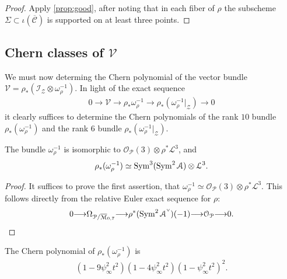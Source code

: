 \documentclass[12pt,reqno]{amsart}
\DeclareMathOperator{\M}{\mathcal{M}}
\renewcommand{\to}{{\longrightarrow}}
\numberwithin{equation}{section}
\renewcommand{\O}{\mathcal O}
\newcommand{\V}{\mathcal V}
\newcommand{\cP}{\mathcal P}
\newcommand{\smvee}{\raise0.5ex\hbox{$\scriptscriptstyle\vee$}}
\renewcommand {\o}[1]{\overline{#1}}
\begin{document}
\begin{proof}
  Apply \autoref{prop:good}, after noting that in
  each fiber of $\rho$ the subscheme
  $\Sigma \subset \iota(\o{\mathcal{C}})$ is supported on at least
  three points.
\end{proof}

\subsection{Chern classes of $\V$}
\label{sec:chern-classes-v2}

We must now determing the Chern polynomial of the vector bundle
$\V = \rho_{*}(\mathcal{I}_{\mathcal{Z}} \otimes
\omega_{\rho}^{-1})$. In light of the exact sequence
\begin{align}
  \label{eq:exact2}
  0 \to \V \to \rho_{*}\omega_{\rho}^{-1} \to \rho_{*}(\omega_{\rho}^{-1}|_{\mathcal{Z}}) \to 0
\end{align}
it clearly suffices to determine the Chern polynomials of the rank
$10$ bundle $\rho_{*}(\omega_{\rho}^{-1})$ and the rank $6$ bundle
$\rho_{*}(\omega_{\rho}^{-1}|_{\mathcal{Z}})$.

\begin{lemma}
  \label{lemma:rank10}
  The bundle $\omega_{\rho}^{-1}$ is isomorphic to
  $\O_{\mathcal{P}}(3) \otimes \rho^{*}\mathcal{L}^{3}$, and
  \begin{align}
    \label{eq:rnk10}
    \rho_{*}(\omega_{\rho}^{-1}) \simeq \operatorname{Sym}^{3}(\operatorname{Sym}^{2} \mathcal{A})\otimes \mathcal{L}^{3}.
  \end{align}
\end{lemma}

\begin{proof}
  It suffices to prove the first assertion, that
  $\omega_{\rho}^{-1} \simeq \O_{\mathcal{P}}(3) \otimes
  \rho^{*}\mathcal{L}^{3}$.  This follows directly from the relative
  Euler exact sequence for $\rho$:
  \begin{align}
    \label{eq:eulerexact}
    0 \to \Omega_{\mathcal{P}/\o{\M}_{0,7}} \to \rho^{*}(\Sym^{2}\mathcal{A}^{\smvee})(-1) \to \O_{\cP} \to 0.
  \end{align}
\end{proof}

\begin{corollary}
  \label{cor:chern10} The Chern polynomial of
  $\rho_{*}(\omega_{\rho}^{-1})$ is
  \begin{align}
    \label{eq:chern10}
    (1-9\psi_{\infty}^{2}t^{2})(1-4\psi_{\infty}^{2}t^{2})(1-\psi_{\infty}^{2}t^{2})^{2}.
  \end{align}
\end{corollary}
\end{document}

